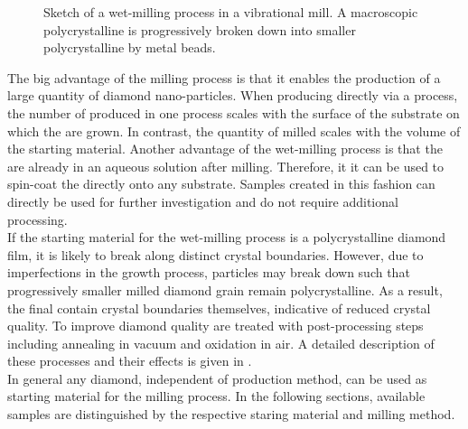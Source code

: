 	\begin{figure}[!htb]
		\centering
		\caption[Wet-milling in a vibrational mill]{Sketch of a wet-milling process in a vibrational mill. A macroscopic polycrystalline \nd is progressively broken down into smaller polycrystalline \nds by metal beads.}\label{fig::sketch_milling}
	\end{figure}

	The big advantage of the milling process is that it enables the production of a large quantity of diamond nano-particles.
	When producing \nds directly via a \CVD process, the number of produced \nds in one process scales with the surface of the substrate on which the \nds are grown.
	In contrast, the quantity of milled \nds scales with the volume of the starting material.
	Another advantage of the wet-milling process is that the \nds are already in an aqueous solution after milling.
	Therefore, it it can be used to spin-coat the \nds directly onto any substrate. Samples created in this fashion can directly be used for further investigation and do not require additional processing.
	\\
	If the starting material for the wet-milling process is a polycrystalline diamond film, it is likely to break along distinct crystal boundaries.
	However, due to imperfections in the growth process, particles may break down such that progressively smaller milled diamond grain remain polycrystalline.
	As a result, the final \nds contain crystal boundaries themselves, indicative of reduced crystal quality.
	To improve diamond quality \nds are treated with post-processing steps including annealing in vacuum and oxidation in air.
	A detailed description of these processes and their effects is given in .
	\\
	In general any diamond, independent of production method, can be used as starting material for the milling process.
	In the following sections, available samples are distinguished by the respective staring material and milling method.

